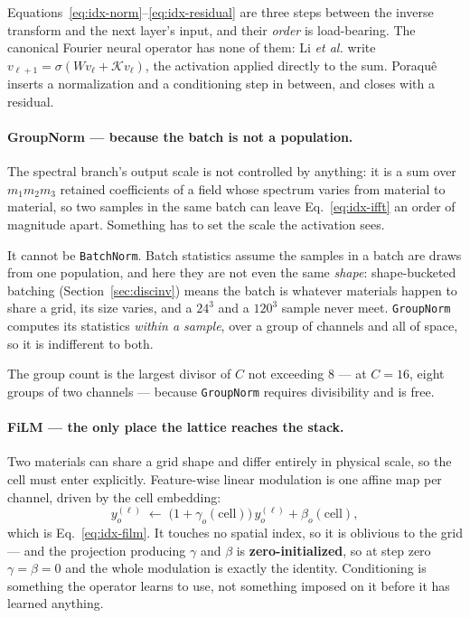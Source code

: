 Equations~\eqref{eq:idx-norm}--\eqref{eq:idx-residual} are three steps between
the inverse transform and the next layer's input, and their \emph{order} is
load-bearing. The canonical Fourier neural operator has none of them: Li
\emph{et al.} write $v_{\ell+1} = \sigma(W v_\ell + \mathcal{K}v_\ell)$, the
activation applied directly to the sum. Poraqu\^e inserts a normalization and a
conditioning step in between, and closes with a residual.

\paragraph{GroupNorm --- because the batch is not a population.}
The spectral branch's output scale is not controlled by anything: it is a sum
over $m_1m_2m_3$ retained coefficients of a field whose spectrum varies from
material to material, so two samples in the same batch can leave
Eq.~\eqref{eq:idx-ifft} an order of magnitude apart. Something has to set the
scale the activation sees.

It cannot be \texttt{BatchNorm}. Batch statistics assume the samples in a batch
are draws from one population, and here they are not even the same
\emph{shape}: shape-bucketed batching (Section~\ref{sec:discinv}) means the
batch is whatever materials happen to share a grid, its size varies, and a
$24^3$ and a $120^3$ sample never meet. \texttt{GroupNorm} computes its
statistics \emph{within a sample}, over a group of channels and all of space,
so it is indifferent to both.

The group count is the largest divisor of $C$ not exceeding $8$ --- at $C=16$,
eight groups of two channels --- because \texttt{GroupNorm} requires
divisibility and  is free.

\paragraph{FiLM --- the only place the lattice reaches the stack.}
Two materials can share a grid shape and differ entirely in physical scale, so
the cell must enter explicitly. Feature-wise linear modulation is one affine
map per channel, driven by the cell embedding:
\begin{equation}
  y^{(\ell)}_{o} \;\longleftarrow\;
  \bigl(1 + \gamma_{o}(\text{cell})\bigr)\, y^{(\ell)}_{o}
  + \beta_{o}(\text{cell}),
\end{equation}
which is Eq.~\eqref{eq:idx-film}. It touches no spatial index, so it is
oblivious to the grid --- and the projection producing $\gamma$ and $\beta$ is
\textbf{zero-initialized}, so at step zero $\gamma = \beta = 0$ and the whole
modulation is exactly the identity. Conditioning is something the operator
learns to use, not something imposed on it before it has learned anything.

